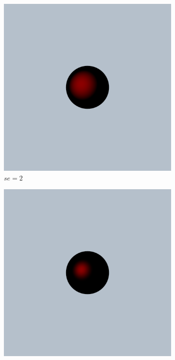 \documentclass{article}
\begin{document}
\begin{figure}[h!]
	\centering
	\begin{subfigure}{0.2\textwidth}
		\includegraphics[width=\textwidth]{specular_sc_0_2_se_2}
		\caption{$se = 2$}
		\label{fig:specular_0_2_2}
	\end{subfigure}%
	\hfill
	\begin{subfigure}{0.2\textwidth}
		\includegraphics[width=\textwidth]{specular_sc_0_2_se_8}

\end{subfigure}
\end{figure}
\end{document}
